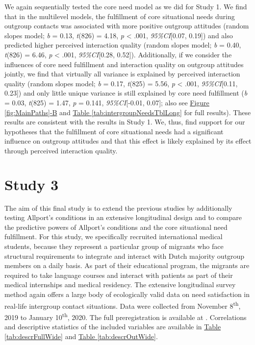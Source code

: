 \documentclass[man, 12pt, a4paper, mask]{apa7}
\theoremstyle{break}
\theoremstyle{plain}
\newcommand{\fgrref}[2][]{\hyperref[#2]{Figure \ref*{#2}#1}}
\newcommand{\tblref}[2][]{\hyperref[#2]{Table \ref*{#2}#1}}
\begin{document}
We again sequentially tested the core need model as we did for Study 1.
We find that in the multilevel models, the fulfillment of core
situational needs during outgroup contacts was associated with more
positive outgroup attitudes (random slopes model; \textit{b} = 0.13,
\textit{t}(826) = 4.18, \textit{p} \textless{} .001,
\textit{95\%CI}{[}0.07, 0.19{]}) and also predicted higher perceived
interaction quality (random slopes model; \textit{b} = 0.40,
\textit{t}(826) = 6.46, \textit{p} \textless{} .001,
\textit{95\%CI}{[}0.28, 0.52{]}). Additionally, if we consider the
influences of core need fulfillment and interaction quality on outgroup
attitudes jointly, we find that virtually all variance is explained by
perceived interaction quality (random slopes model; \textit{b} = 0.17,
\textit{t}(825) = 5.56, \textit{p} \textless{} .001,
\textit{95\%CI}{[}0.11, 0.23{]}) and only little unique variance is
still explained by core need fulfillment (\textit{b} = 0.03,
\textit{t}(825) = 1.47, \textit{p} = 0.141, \textit{95\%CI}{[}-0.01,
0.07{]}; also see \fgrref[-B]{fig:MainPaths} and
\tblref{tab:intergroupNeedsTblLong} for full results). These results are
consistent with the results in Study 1. We, thus, find support for our
hypotheses that the fulfillment of core situational needs had a
significant influence on outgroup attitudes and that this effect is
likely explained by its effect through perceived interaction quality.

\section{Study 3}

The aim of this final study is to extend the previous studies by
additionally testing Allport's conditions in an extensive longitudinal
design and to compare the predictive powers of Allport's conditions and
the core situational need fulfillment. For this study, we specifically
recruited international medical students, because they represent a
particular group of migrants who face structural requirements to
integrate and interact with Dutch majority outgroup members on a daily
basis. As part of their educational program, the migrants are required
to take language courses and interact with patients as part of their
medical internships and medical residency. The extensive longitudinal
survey method again offers a large body of ecologically valid data on
need satisfaction in real-life intergroup contact situations. Data were
collected from November 8\textsuperscript{th}, 2019 to January
10\textsuperscript{th}, 2020. The full preregistration is available at
\citet[][]{KreienkampMasked2021f}. Correlations and descriptive
statistics of the included variables are available in
\tblref{tab:descrFullWide} and \tblref{tab:descrOutWide}.
\end{document}
